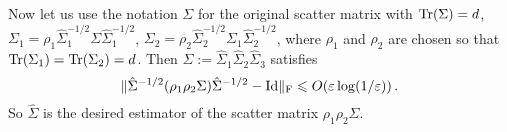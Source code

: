 Now let us use the notation $\Sigma$ for the original scatter matrix with $\operatorname{Tr}(\Sigma) = d$, 
$\Sigma_1 = \rho_1\hat{\Sigma}_1^{-1/2}\Sigma\hat{\Sigma}_1^{-1/2}$, 
$\Sigma_2 = \rho_2\hat{\Sigma}_2^{-1/2}\Sigma_1\hat{\Sigma}_2^{-1/2}$, where $\rho_1$ and $\rho_2$ are chosen so that $\operatorname{Tr}(\Sigma_1) = \operatorname{Tr}(\Sigma_2) = d$. Then $\hat{\Sigma} := \hat{\Sigma}_1 \hat{\Sigma}_2 \hat{\Sigma}_3$
satisfies
\[
\normf{\hat{\Sigma}^{-1/2} \Paren{\rho_1\rho_2\Sigma} \hat{\Sigma}^{-1/2}  - \Id}\le O(\e\log(1/\e))\,.
\]
So $\hat{\Sigma}$ is the desired estimator of the scatter matrix $\rho_1\rho_2\Sigma$.




